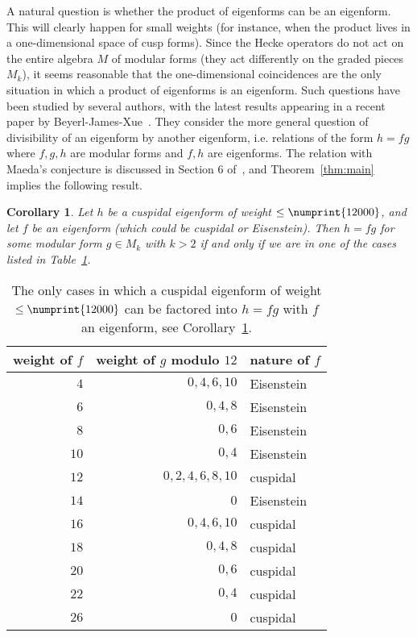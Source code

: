 \documentclass[11pt]{article}
\theoremstyle{plain}
\newtheorem{corollary}[theorem]{Corollary}
\theoremstyle{definition}
\theoremstyle{remark}
\numberwithin{equation}{section}
\newcommand{\bound}{\numprint{12000}}
\begin{document}
A natural question is whether the product of eigenforms can be an eigenform.
This will clearly happen for small weights (for instance, when the product
lives in a one-dimensional space of cusp forms).  Since the Hecke operators
do not act on the entire algebra $M$ of modular forms (they act
differently on the graded pieces $M_k$), it seems reasonable that the
one-dimensional coincidences are the only situation in which a product of
eigenforms is an eigenform.  Such questions have been studied by several
authors, with the latest results appearing in a recent paper by
Beyerl-James-Xue~\cite{BeyerlJamesXue}.  They consider the more general question
of divisibility of an
eigenform by another eigenform, i.e. relations of the form $h=fg$ where
$f,g,h$ are modular forms and $f,h$ are eigenforms.  The relation with Maeda's 
conjecture is discussed in Section 6 of~\cite{BeyerlJamesXue}, and 
Theorem~\ref{thm:main} implies the following result.

\begin{corollary}
  \label{cor:div_eigen}
  Let $h$ be a cuspidal eigenform of weight $\leq\bound$, and let 
  $f$ be an eigenform
  (which could be cuspidal or Eisenstein).  Then $h=fg$ for some modular form
  $g\in M_k$ with $k>2$ if and only if we are in one of the cases listed in 
  Table~\ref{tbl:div_eigen}.
\end{corollary}

\begin{table}[h]
  \begin{center}
  \begin{tabular}{r|r|l}
    weight of $f$ & weight of $g$ modulo $12$ & nature of $f$ \\ \hline
    $4$ & $0,4,6,10$ & Eisenstein \\
    $6$ & $0,4,8$ & Eisenstein \\
    $8$ & $0,6$ & Eisenstein \\
    $10$ & $0,4$ & Eisenstein \\
    $12$ & $0,2,4,6,8,10$ & cuspidal\\
    $14$ & $0$ & Eisenstein \\
    $16$ & $0,4,6,10$ & cuspidal\\
    $18$ & $0,4,8$ & cuspidal\\
    $20$ & $0,6$ & cuspidal\\
    $22$ & $0,4$ & cuspidal\\
    $26$ & $0$ & cuspidal
  \end{tabular}
\end{center}
  \caption{The only cases in which a cuspidal eigenform of weight $\leq\bound$
  can be factored into $h=fg$ with $f$ an eigenform, see
  Corollary~\ref{cor:div_eigen}.}
  \label{tbl:div_eigen}
\end{table}
\end{document}
